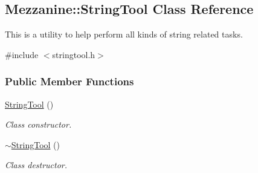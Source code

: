 \hypertarget{classMezzanine_1_1StringTool}{
\subsection{Mezzanine::StringTool Class Reference}
\label{classMezzanine_1_1StringTool}
}


This is a utility to help perform all kinds of string related tasks.  




{\ttfamily \#include $<$stringtool.h$>$}

\subsubsection*{Public Member Functions}
\begin{DoxyCompactItemize}
\item 
\hypertarget{classMezzanine_1_1StringTool_a44d7aed7fbd857e9e164c0e59e060190}{
\hyperlink{classMezzanine_1_1StringTool_a44d7aed7fbd857e9e164c0e59e060190}{StringTool} ()}
\label{classMezzanine_1_1StringTool_a44d7aed7fbd857e9e164c0e59e060190}

\begin{DoxyCompactList}\small\item\em Class constructor. \item\end{DoxyCompactList}\item 
\hypertarget{classMezzanine_1_1StringTool_ada6b663446a4d236999bb7d99a9ebe59}{
\hyperlink{classMezzanine_1_1StringTool_ada6b663446a4d236999bb7d99a9ebe59}{$\sim$StringTool} ()}
\label{classMezzanine_1_1StringTool_ada6b663446a4d236999bb7d99a9ebe59}

\begin{DoxyCompactList}\small\item\em Class destructor. \item\end{DoxyCompactList}\end{DoxyCompactItemize}
